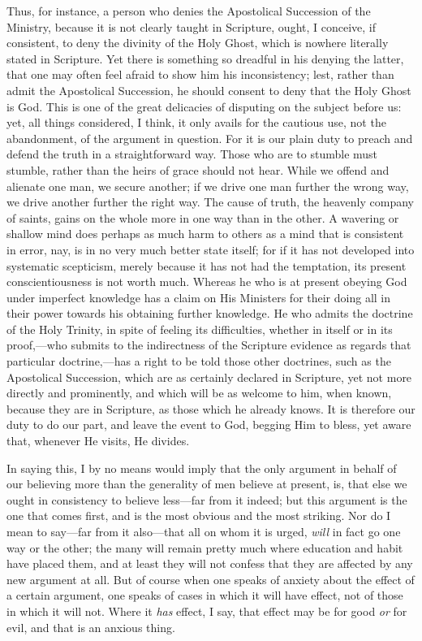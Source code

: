 Thus, for instance, a person who denies the Apostolical Succession
of the Ministry, because it is not clearly taught in Scripture, ought,
I conceive, if consistent, to deny the divinity of the Holy Ghost,
which is nowhere literally stated in Scripture. Yet there is something
so dreadful in his denying the latter, that one may often feel afraid
to show him his inconsistency; lest, rather than admit the Apostolical
Succession, he should consent to deny that the Holy Ghost is God. This
is one of the great delicacies of disputing on the subject before us:
yet, all things considered, I think, it only avails for the cautious
use, not the abandonment, of the argument in question. For it is our
plain duty to preach and defend the truth in a straightforward way.
Those who are to stumble must stumble, rather than the heirs of grace
should not hear. While we offend and alienate one man, we secure
another; if we drive one man further the wrong way, we drive another
further the right way. The cause of truth, the heavenly company of
saints, gains on the whole more in one way than in the other. A
wavering or shallow mind does perhaps as much harm to others as a mind
that is consistent in error, nay, is in no very much better state
itself; for if it has not developed into systematic scepticism, merely
because it has not had the temptation, its present conscientiousness
is not worth much. Whereas he who is at present obeying God under
imperfect knowledge has a claim on His Ministers for their doing all
in their power towards his obtaining further knowledge. He who admits
the doctrine of the Holy Trinity, in spite of feeling its
difficulties, whether in itself or in its proof,—who submits to the
indirectness of the Scripture evidence as regards that particular
doctrine,—has a right to be told those other doctrines, such
as the Apostolical Succession, which are as certainly declared in
Scripture, yet not more directly and prominently, and which will be as
welcome to him, when known, because they are in Scripture, as those
which he already knows. It is therefore our duty to do our part, and
leave the event to God, begging Him to bless, yet aware that, whenever
He visits, He divides.

In saying this, I by no means would imply that the only argument in
behalf of our believing more than the generality of men believe at
present, is, that else we ought in consistency to believe less—far
from it indeed; but this argument is the one that comes first, and is
the most obvious and the most striking. Nor do I mean to say—far
from it also—that all on whom it is urged, \emph{will} in fact go
one way or the other; the many will remain pretty much where education
and habit have placed them, and at least they will not confess that
they are affected by any new argument at all. But of course when one
speaks of anxiety about the effect of a certain argument, one speaks
of cases in which it will have effect, not of those in which it will
not. Where it \emph{has} effect, I say, that effect may be for good \emph{or}
for evil, and that is an anxious thing.

